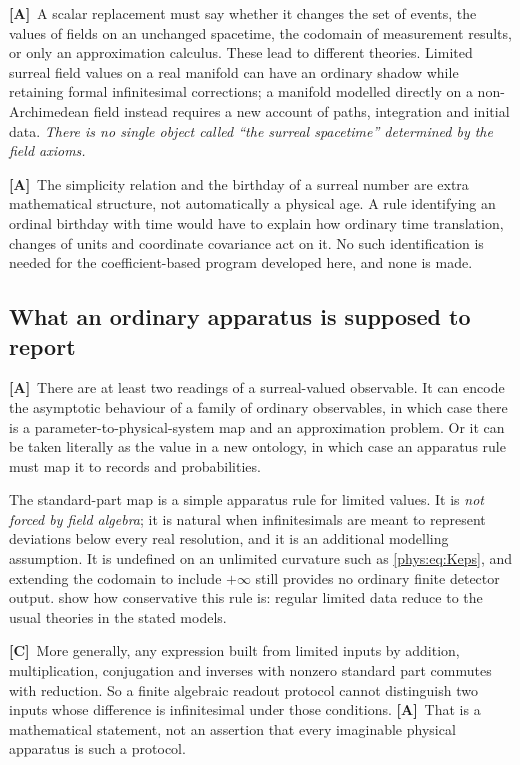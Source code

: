\documentclass[11pt,letterpaper]{article}
\numberwithin{equation}{section}
\theoremstyle{definition}
\theoremstyle{remark}
\newcommand{\TC}{\textcolor{TierC}{\textsf{\bfseries[C]}}}
\newcommand{\TA}{\textcolor{TierA}{\textsf{\bfseries[A]}}}
\begin{document}
\TA\ A scalar replacement must say whether it changes the set of events, the
values of fields on an unchanged spacetime, the codomain of measurement
results, or only an approximation calculus. These lead to different theories.
Limited surreal field values on a real manifold can have an ordinary shadow
while retaining formal infinitesimal corrections; a manifold modelled directly
on a non-Archimedean field instead requires a new account of paths,
integration and initial data. \emph{There is no single object called ``the
surreal spacetime'' determined by the field axioms.}

\TA\ The simplicity relation and the birthday of a surreal number are extra
mathematical structure, not automatically a physical age. A rule identifying an
ordinal birthday with time would have to explain how ordinary time translation,
changes of units and coordinate covariance act on it. No such identification is
needed for the coefficient-based program developed here, and none is made.

\subsection{What an ordinary apparatus is supposed to report}
\label{phys:sub:readout}

\TA\ There are at least two readings of a surreal-valued observable. It can
encode the asymptotic behaviour of a family of ordinary observables, in which
case there is a parameter-to-physical-system map and an approximation problem.
Or it can be taken literally as the value in a new ontology, in which case an
apparatus rule must map it to records and probabilities.

The standard-part map is a simple apparatus rule for limited values. It is
\emph{not forced by field algebra}; it is natural when infinitesimals are meant
to represent deviations below every real resolution, and it is an additional
modelling assumption. It is undefined on an unlimited curvature such as
\eqref{phys:eq:Keps}, and extending the codomain to include $+\infty$ still
provides no ordinary finite detector output.
 show how conservative this
rule is: regular limited data reduce to the usual theories in the stated
models.

\TC\ More generally, any expression built from limited inputs by addition,
multiplication, conjugation and inverses with nonzero standard part commutes
with reduction. So a finite algebraic readout protocol cannot distinguish two
inputs whose difference is infinitesimal under those conditions. \TA\ That is a
mathematical statement, not an assertion that every imaginable physical
apparatus is such a protocol.
\end{document}

